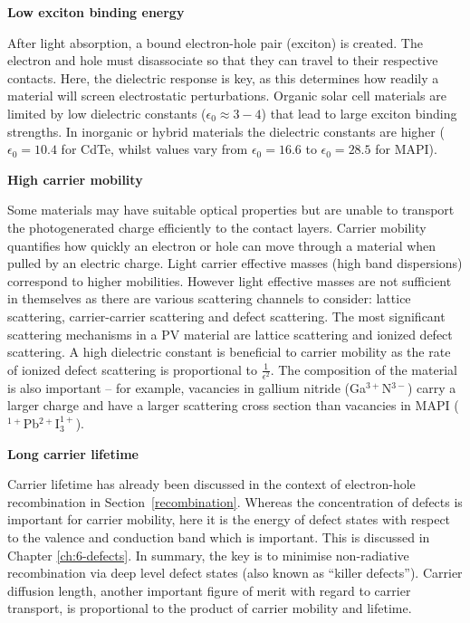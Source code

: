 \textbf{Low exciton binding energy}

After light absorption, a bound electron-hole pair (exciton) is created. The electron and hole must disassociate so that they can travel to their respective contacts. Here, the dielectric response is key, as this determines how readily a material will screen electrostatic perturbations. Organic solar cell materials are limited by low dielectric constants ($\epsilon_0 \approx 3-4$) that lead to large exciton binding strengths.\autocite{Brebels2017} In inorganic or hybrid materials the dielectric constants are higher ($\epsilon_0=10.4$ for CdTe,\autocite{Madelung2004} whilst values vary from $\epsilon_0=16.6$ to $\epsilon_0=28.5$ for MAPI\autocite{Wilson2019}).


\textbf{High carrier mobility}

Some materials may have suitable optical properties but are unable to transport the photogenerated charge efficiently to the contact layers. Carrier mobility quantifies how quickly an electron or hole can move through a material when pulled by an electric charge. 
Light carrier effective masses (high band dispersions) correspond to higher mobilities. However light effective masses are not sufficient in themselves as there are various scattering channels to consider: lattice scattering, carrier-carrier scattering and defect scattering. The most significant scattering mechanisms in a PV material are lattice scattering and ionized defect scattering.
A high dielectric constant is beneficial to carrier mobility as the rate of ionized defect scattering is proportional to $\frac{1}{\epsilon^2}$. The composition of the material is also important -- for example, vacancies in gallium nitride (Ga$^{3+}$N$^{3-}$) carry a larger charge and have a larger scattering cross section than vacancies in MAPI ($^{1+}$Pb$^{2+}$I$^{1+}_3$).


\textbf{Long carrier lifetime}

Carrier lifetime has already been discussed in the context of electron-hole recombination in Section\ \ref{recombination}. Whereas the concentration of defects is important for carrier mobility, here it is the energy of defect states with respect to the valence and conduction band which is important. This is discussed in Chapter \ref{ch:6-defects}. In summary, the key is to minimise non-radiative recombination via deep level defect states (also known as ``killer defects''). Carrier diffusion length, another important figure of merit with regard to carrier transport, is proportional to the product of carrier mobility and lifetime.


